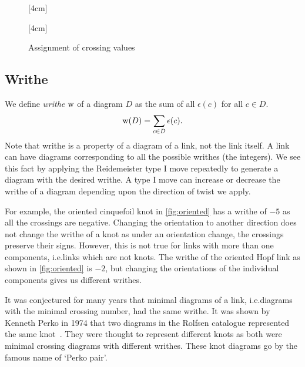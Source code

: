 \begin{figure}
    \centering
    [4cm]{
        }\quad
    [4cm]{
        }
    \caption{Assignment of crossing values}
    \label{fig:crossings}
\end{figure}

\subsection{Writhe}

We define \textit{writhe} \(\operatorname{w}\) of a diagram \(D\) as the sum of all \(\epsilon(c)\) for all \(c \in D\). \[\operatorname{w}(D) = \sum_{c\in D} \epsilon(c).\] Note that writhe is a property of a diagram of a link, not the link itself. A link can have diagrams corresponding to all the possible writhes (the integers). We see this fact by applying the Reidemeister type I move repeatedly to generate a diagram with the desired writhe. A type I move can increase or decrease the writhe of a diagram depending upon the direction of twist we apply.

For example, the oriented cinquefoil knot in \cref{fig:oriented} has a writhe of \(-5\) as all the crossings are negative. Changing the orientation to another direction does not change the writhe of a knot as under an orientation change, the crossings preserve their signs. However, this is not true for links with more than one components, i.e.\@ links which are not knots. The writhe of the oriented Hopf link as shown in \cref{fig:oriented} is \(-2\), but changing the orientations of the individual components gives us different writhes.

It was conjectured for many years that minimal diagrams of a link, i.e.\@ diagrams with the minimal crossing number, had the same writhe. It was shown by Kenneth Perko in 1974 that two diagrams in the Rolfsen catalogue represented the same knot~\cite{perko}. They were thought to represent different knots as both were minimal crossing diagrams with different writhes. These knot diagrams go by the famous name of `Perko pair'.

